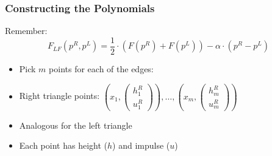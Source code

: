 \documentclass{beamer}
\begin{document}
\begin{frame}
  \frametitle{Constructing the Polynomials}
  Remember:
  \begin{equation*}
    F_{LF}(p^R,p^L) = \dfrac{1}{2}\cdot (F(p^R) + F(p^L)) - \alpha \cdot (p^R - p^L)
  \end{equation*}
  \begin{itemize}
  \item Pick $m$ points for each of the edges:
  \item Right triangle points: $\left(x_1,\begin{pmatrix}
        h_1^R \\ u_1^R
      \end{pmatrix}\right), \dots , \left(x_m, \begin{pmatrix}
        h_m^R \\ u_m^R
      \end{pmatrix}\right)$
  \item Analogous for the left triangle
  \item Each point has height ($h$) and impulse ($u$)

  \end{itemize}


\end{frame}
\end{document}
